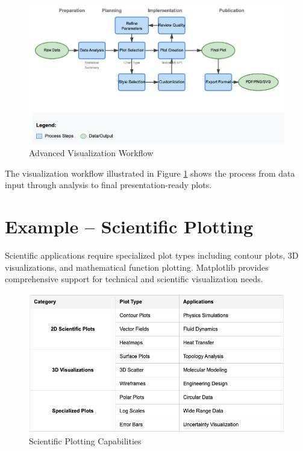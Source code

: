 \begin{figure}[htbp]
	\centering
    \includegraphics[width=1\textwidth]{Images/matplotlib//visualizationWorkflow.png}
	\caption{Advanced Visualization Workflow}
	\label{fig:visualization_workflow}
\end{figure}

The visualization workflow illustrated in Figure \ref{fig:visualization_workflow} shows the process from data input through analysis to final presentation-ready plots.



\section{Example -- Scientific Plotting}
\label{sec:scientific_example}

Scientific applications require specialized plot types including contour plots, 3D visualizations, and mathematical function plotting. Matplotlib provides comprehensive support for technical and scientific visualization needs.

\begin{figure}[htbp]
	\centering
    \includegraphics[width=1\textwidth]{Images/matplotlib/scientificPlotting.png}
	\caption{Scientific Plotting Capabilities}
	\label{fig:scientific_plotting}
\end{figure}

